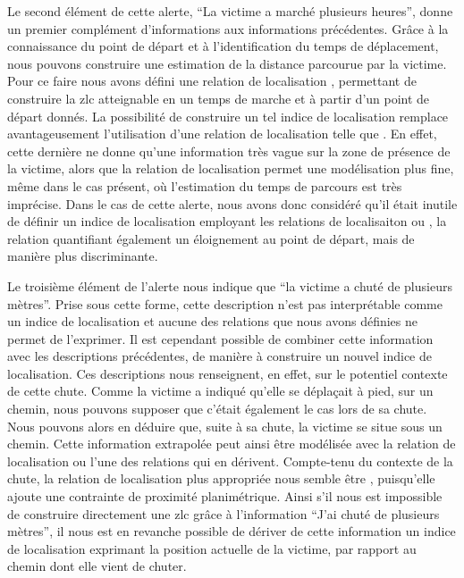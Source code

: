Le second élément de cette alerte, \enquote{La victime a marché
  plusieurs heures}, donne un premier complément d'informations aux
informations précédentes. Grâce à la connaissance du point de départ
et à l'identification du temps de déplacement, nous pouvons construire
une estimation de la distance parcourue par la victime. Pour ce faire
nous avons défini une relation de localisation
, permettant de construire la
\ac{zlc} atteignable en un temps de marche et à partir d'un point de
départ donnés. La possibilité de construire un tel indice de
localisation remplace avantageusement l'utilisation d'une relation de
localisation telle que . En effet, cette
dernière ne donne qu'une information très vague sur la zone de
présence de la victime, alors que la relation de localisation
 permet une modélisation plus
fine, même dans le cas présent, où l'estimation du temps de parcours
est très imprécise. Dans le cas de cette alerte, nous avons donc
considéré qu'il était inutile de définir un indice de localisation
employant les relations de localisaiton 
ou , la relation
 quantifiant également un
éloignement au point de départ, mais de manière plus discriminante.

Le troisième élément de l'alerte nous indique que \enquote{la victime
  a chuté de plusieurs mètres}. Prise sous cette forme, cette
description n'est pas interprétable comme un indice de localisation et
aucune des relations que nous avons définies ne permet de
l'exprimer. Il est cependant possible de combiner cette information
avec les descriptions précédentes, de manière à construire un nouvel
indice de localisation. Ces descriptions nous renseignent, en effet,
sur le potentiel contexte de cette chute. Comme la victime a indiqué
qu'elle se déplaçait à pied, sur un chemin, nous pouvons supposer que
c'était également le cas lors de sa chute. Nous pouvons alors en
déduire que, suite à sa chute, la victime se situe sous un
chemin. Cette information extrapolée peut ainsi être modélisée avec la
relation de localisation  ou l'une des
relations qui en dérivent. Compte-tenu du contexte de la chute, la
relation de localisation plus appropriée nous semble être
, puisqu’elle ajoute une contrainte de
proximité planimétrique. Ainsi s'il nous est impossible de construire
directement une \ac{zlc} grâce à l'information \enquote{J'ai chuté de
  plusieurs mètres}, il nous est en revanche possible de dériver de
cette information un indice de localisation exprimant la position
actuelle de la victime, par rapport au chemin dont elle vient de
chuter.

